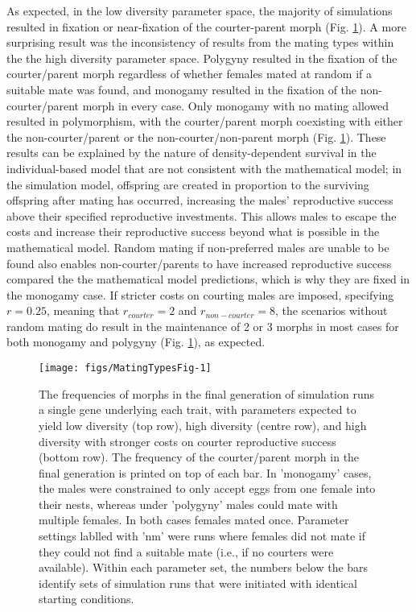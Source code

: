 \documentclass[11pt,]{article}
\begin{document}
As expected, in the low diversity parameter space, the majority of simulations resulted in fixation or near-fixation of the courter-parent morph (Fig. \ref{fig:MatingTypesFig}). A more surprising result was the inconsistency of results from the mating types within the the high diversity parameter space. Polygyny resulted in the fixation of the courter/parent morph regardless of whether females mated at random if a suitable mate was found, and monogamy resulted in the fixation of the non-courter/parent morph in every case. Only monogamy with no mating allowed resulted in polymorphism, with the courter/parent morph coexisting with either the non-courter/parent or the non-courter/non-parent morph (Fig. \ref{fig:MatingTypesFig}). These results can be explained by the nature of density-dependent survival in the individual-based model that are not consistent with the mathematical model; in the simulation model, offspring are created in proportion to the surviving offspring after mating has occurred, increasing the males' reproductive success above their specified reproductive investments. This allows males to escape the costs and increase their reproductive success beyond what is possible in the mathematical model. Random mating if non-preferred males are unable to be found also enables non-courter/parents to have increased reproductive success compared the the mathematical model predictions, which is why they are fixed in the monogamy case. If stricter costs on courting males are imposed, specifying \(r=0.25\), meaning that \(r_{courter}=2\) and \(r_{non-courter}=8\), the scenarios without random mating do result in the maintenance of 2 or 3 morphs in most cases for both monogamy and polygyny (Fig. \ref{fig:MatingTypesFig}), as expected.

\begin{figure}[H]
\texttt{[image: figs/MatingTypesFig-1]} \caption{The frequencies of morphs in the final generation of simulation runs a single gene underlying each trait, with parameters expected to yield low diversity (top row), high diversity (centre row), and high diversity with stronger costs on courter reproductive success (bottom row). The frequency of the courter/parent morph in the final generation is printed on top of each bar. In 'monogamy' cases, the males were constrained to only accept eggs from one female into their nests, whereas under 'polygyny' males could mate with multiple females. In both cases females mated once. Parameter settings lablled with 'nm' were runs where females did not mate if they could not find a suitable mate (i.e., if no courters were available). Within each parameter set, the numbers below the bars identify sets of simulation runs that were initiated with identical starting conditions.}\label{fig:MatingTypesFig}
\end{figure}
\end{document}
